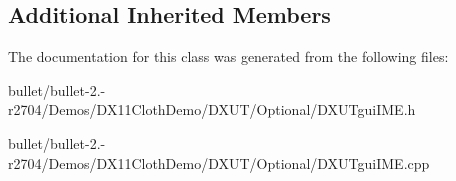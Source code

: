 \subsection*{Additional Inherited Members}


The documentation for this class was generated from the following files\+:\begin{DoxyCompactItemize}
\item 
bullet/bullet-\/2.-\/r2704/\+Demos/\+D\+X11\+Cloth\+Demo/\+D\+X\+U\+T/\+Optional/D\+X\+U\+Tgui\+I\+M\+E.\+h\item 
bullet/bullet-\/2.-\/r2704/\+Demos/\+D\+X11\+Cloth\+Demo/\+D\+X\+U\+T/\+Optional/D\+X\+U\+Tgui\+I\+M\+E.\+cpp\end{DoxyCompactItemize}
